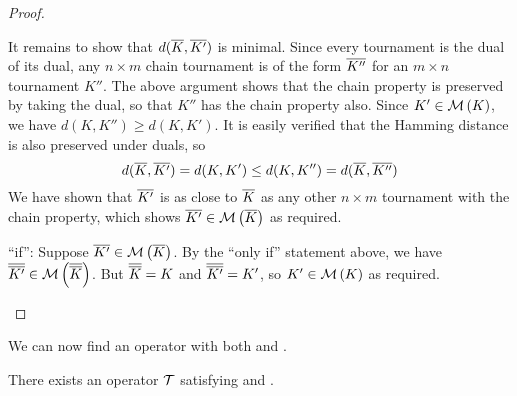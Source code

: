 \begin{proof}
\begin{itemize}
    It remains to show that $d({\overline{K}}, {\overline{K'}})$ is minimal. Since every
    tournament is the dual of its dual, any $n \times m$ chain tournament is of
    the form ${\overline{K''}}$ for an $m \times n$ tournament $K''$. The above
    argument shows that the chain property is preserved by taking the dual, so
    that $K''$ has the chain property also. Since $K' \in \operatorname{\mathcal{M}}\left({K}\right)$, we have
    $d(K, K'') \ge d(K, K')$. It is easily verified that the Hamming distance
    is also preserved under duals, so
    \[
        d({\overline{K}}, {\overline{K'}})
        = d(K, K')
        \le d(K, K'')
        = d({\overline{K}}, {\overline{K''}})
    \]
    We have shown that ${\overline{K'}}$ is as close to ${\overline{K}}$ as any other $n
    \times m$ tournament with the chain property, which shows ${\overline{K'}} \in
    \operatorname{\mathcal{M}}\left({{\overline{K}}}\right)$ as required.

    ``if'': Suppose ${\overline{K'}} \in \operatorname{\mathcal{M}}\left({{\overline{K}}}\right)$. By the ``only if'' statement
    above, we have ${\overline{{\overline{K'}}}} \in \operatorname{\mathcal{M}}\left({{\overline{{\overline{K}}}}}\right)$. But
    ${\overline{{\overline{K}}}} = K$ and ${\overline{{\overline{K'}}}} = K'$, so $K' \in \operatorname{\mathcal{M}}\left({K}\right)$ as
    required.
    \end{itemize}
\end{proof}

We can now find an operator with both \chainmin{} and \dualaxiom{}.

\begin{proposition}
    \label{tourn_result_chainmin_dual_compatibility}
    There exists an operator $\mathcal{T}$ satisfying \chainmin{} and
    \dualaxiom{}.
\end{proposition}

